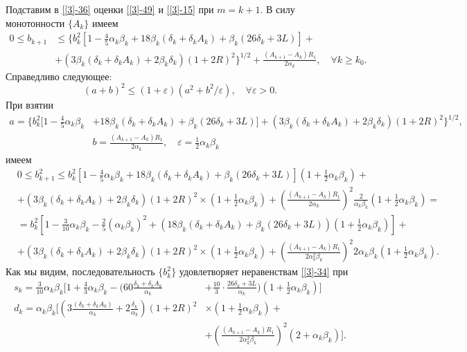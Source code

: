 Подставим в \eqref{[3]-36} оценки \eqref{[3]-49} и \eqref{[3]-15} при $m=k+1$. В силу монотонности $\{A_k\}$ имеем
\begin{equation*}
\begin{aligned}
0\leqslant b_{k+1}&\leqslant\big\{b_k^2\left[1-\frac{4}{5}\alpha_k\beta_k+18\beta_k(\delta_k+\delta_kA_k)+\beta_k(26\delta_k+3L)\right]+\\
&+(3\beta_k(\delta_k+\delta_kA_k)+2\beta_k\delta_k)(1+2R)^2\big\}^{1/2}+\frac{(A_{k+1}-A_k)R_1}{2\alpha_k},\quad \forall k\geqslant k_0.
\end{aligned}
\end{equation*}
Справедливо следующее:
\begin{equation*}
(a+b)^2\leqslant(1+\varepsilon)(a^2+b^2/\varepsilon),\quad\forall\varepsilon>0.
\end{equation*}
При взятии
\begin{equation*}
\begin{aligned}
a=\Big\{b_k^2\Big[1-\frac{4}{5}\alpha_k\beta_k&+18\beta_k(\delta_k+\delta_kA_k)+\beta_k(26\delta_k+3L)\Big]+(3\beta_k(\delta_k+\delta_kA_k)+2\beta_k\delta_k)(1+2R)^2\Big\}^{1/2},\\
&b=\frac{(A_{k+1}-A_k)R_1}{2\alpha_k},\quad \varepsilon=\frac{1}{2}\alpha_k\beta_k
\end{aligned}
\end{equation*}
имеем
\begin{equation*}
\begin{aligned}
&0\leqslant b_{k+1}^2\leqslant b_k^2\left[1-\frac{4}{5}\alpha_k\beta_k+18\beta_k(\delta_k+\delta_kA_k)+\beta_k(26\delta_k+3L)\right](1+\frac{1}{2}\alpha_k\beta_k)+\\
&+(3\beta_k(\delta_k+\delta_kA_k)+2\beta_k\delta_k)(1+2R)^2\times(1+\frac{1}{2}\alpha_k\beta_k)+\left(\frac{(A_{k+1}-A_k)R_1}{2\alpha_k}\right)^2\frac{2}{\alpha_k\beta_k}(1+\frac{1}{2}\alpha_k\beta_k)=\\
&=b_k^2\left[1-\frac{3}{10}\alpha_k\beta_k-\frac{2}{5}(\alpha_k\beta_k)^2+(18\beta_k(\delta_k+\delta_kA_k)+\beta_k(26\delta_k+3L))(1+\frac{1}{2}\alpha_k\beta_k)\right]+\\
&+(3\beta_k(\delta_k+\delta_kA_k)+2\beta_k\delta_k)(1+2R)^2\times(1+\frac{1}{2}\alpha_k\beta_k)+\left(\frac{(A_{k+1}-A_k)R_1}{2\alpha_k^2\beta_k}\right)^2 2\alpha_k\beta_k(1+\frac{1}{2}\alpha_k\beta_k).
\end{aligned}
\end{equation*}
Как мы видим, последовательность $\{b_k^2\}$ удовлетворяет неравенствам \eqref{[3]-34} при
\begin{equation}
\label{[3]-50}
\begin{aligned}
s_k=\frac{3}{10}\alpha_k\beta_k\Big[1+\frac{4}{3}\alpha_k\beta_k-(60\frac{\delta_k+\delta_kA_k}{\alpha_k}&+\frac{10}{3}\cdot\frac{26\delta_k+3L}{\alpha_k})(1+\frac{1}{2}\alpha_k\beta_k)\Big]\\
d_k=\alpha_k\beta_k\Big[(3\frac{(\delta_k+\delta_kA_k)}{\alpha_k}+2\frac{\delta_k}{\alpha_k})(1+2R)^2&\times(1+\frac{1}{2}\alpha_k\beta_k)+\\
&+\left(\frac{(A_{k+1}-A_k)R_1}{2\alpha_k^2\beta_k}\right)^2 (2+\alpha_k\beta_k)\Big].
\end{aligned}
\end{equation}
